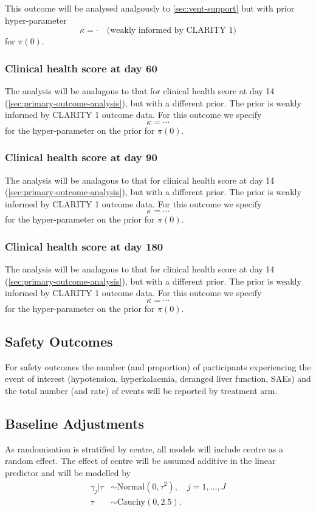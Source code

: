 \documentclass[11pt,parskip=half-]{scrartcl}
\begin{document}
This outcome will be analysed analgously to \ref{sec:vent-support} but with prior hyper-parameter
$$
    \kappa = \cdot \quad \text{(weakly informed by CLARITY 1)}
$$
for $\pi(0)$.

\subsubsection{Clinical health score at day 60}
The analysis will be analagous to that for clinical health score at day 14 (\ref{sec:primary-outcome-analysis}), but with a different prior. The prior is weakly informed by CLARITY 1 outcome data. For this outcome we specify
$$
    \kappa = \cdots
$$
for the hyper-parameter on the prior for $\pi(0)$.

\subsubsection{Clinical health score at day 90}
The analysis will be analagous to that for clinical health score at day 14 (\ref{sec:primary-outcome-analysis}), but with a different prior. The prior is weakly informed by CLARITY 1 outcome data. For this outcome we specify
$$
    \kappa = \cdots
$$
for the hyper-parameter on the prior for $\pi(0)$.

\subsubsection{Clinical health score at day 180}
The analysis will be analagous to that for clinical health score at day 14 (\ref{sec:primary-outcome-analysis}), but with a different prior. The prior is weakly informed by CLARITY 1 outcome data. For this outcome we specify
$$
    \kappa = \cdots
$$
for the hyper-parameter on the prior for $\pi(0)$.

\subsection{Safety Outcomes}

For safety outcomes the number (and proportion) of participants experiencing the event of interest (hypotension, hyperkalaemia, deranged liver function, SAEs) and the total number (and rate) of events will be reported by treatment arm.


\subsection{Baseline Adjustments}
As randomisation is stratified by centre, all models will include centre as a random effect. The effect of centre will be assumed additive in the linear predictor and will be modelled by
$$
    \begin{aligned}
        \gamma_j|\tau & \sim \text{Normal}(0, \tau^2), \quad j =1,...,J \\
        \tau          & \sim \text{Cauchy}(0, 2.5).
    \end{aligned}
$$
\end{document}
